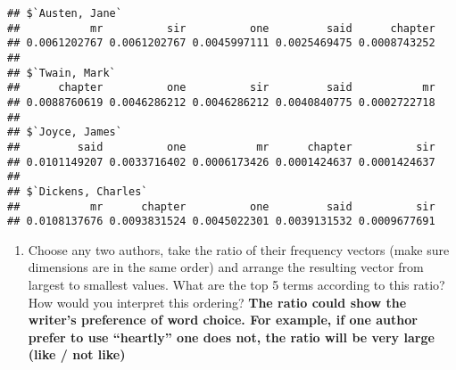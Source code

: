 \documentclass[]{article}
\newenvironment{Shaded}{\begin{snugshade}}{\end{snugshade}}
\newcommand{\KeywordTok}[1]{\textcolor[rgb]{0.13,0.29,0.53}{\textbf{#1}}}
\newcommand{\DataTypeTok}[1]{\textcolor[rgb]{0.13,0.29,0.53}{#1}}
\newcommand{\DecValTok}[1]{\textcolor[rgb]{0.00,0.00,0.81}{#1}}
\newcommand{\StringTok}[1]{\textcolor[rgb]{0.31,0.60,0.02}{#1}}
\newcommand{\CommentTok}[1]{\textcolor[rgb]{0.56,0.35,0.01}{\textit{#1}}}
\newcommand{\ControlFlowTok}[1]{\textcolor[rgb]{0.13,0.29,0.53}{\textbf{#1}}}
\newcommand{\OperatorTok}[1]{\textcolor[rgb]{0.81,0.36,0.00}{\textbf{#1}}}
\newcommand{\NormalTok}[1]{#1}
\providecommand{\tightlist}{%
  \setlength{\itemsep}{0pt}\setlength{\parskip}{0pt}}
\begin{document}
\begin{Shaded}
\end{Shaded}

\begin{verbatim}
## $`Austen, Jane`
##           mr          sir          one         said      chapter 
## 0.0061202767 0.0061202767 0.0045997111 0.0025469475 0.0008743252 
## 
## $`Twain, Mark`
##      chapter          one          sir         said           mr 
## 0.0088760619 0.0046286212 0.0046286212 0.0040840775 0.0002722718 
## 
## $`Joyce, James`
##         said          one           mr      chapter          sir 
## 0.0101149207 0.0033716402 0.0006173426 0.0001424637 0.0001424637 
## 
## $`Dickens, Charles`
##           mr      chapter          one         said          sir 
## 0.0108137676 0.0093831524 0.0045022301 0.0039131532 0.0009677691
\end{verbatim}

\begin{enumerate}
\def\labelenumi{(\alph{enumi})}
\setcounter{enumi}{4}
\tightlist
\item
  Choose any two authors, take the ratio of their frequency vectors
  (make sure dimensions are in the same order) and arrange the resulting
  vector from largest to smallest values. What are the top 5 terms
  according to this ratio? How would you interpret this ordering?
  \textbf{The ratio could show the writer's preference of word choice.
  For example, if one author prefer to use ``heartly'' one does not, the
  ratio will be very large (like / not like)}
\end{enumerate}
\end{document}
